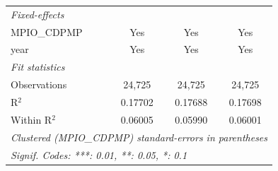 \begin{tabular}{lccc}
   \midrule
   \emph{Fixed-effects}\\
   MPIO\_CDPMP                         & Yes                 & Yes                        & Yes\\  
   year                                & Yes                 & Yes                        & Yes\\  
   \midrule
   \emph{Fit statistics}\\
   Observations                        & 24,725              & 24,725                     & 24,725\\  
   R$^2$                               & 0.17702             & 0.17688                    & 0.17698\\  
   Within R$^2$                        & 0.06005             & 0.05990                    & 0.06001\\  
   \midrule \midrule
   \multicolumn{4}{l}{\emph{Clustered (MPIO\_CDPMP) standard-errors in parentheses}}\\
   \multicolumn{4}{l}{\emph{Signif. Codes: ***: 0.01, **: 0.05, *: 0.1}}\\
\end{tabular}
\par\endgroup


